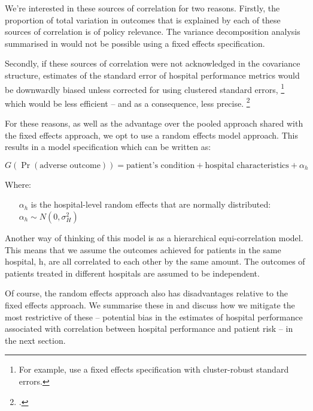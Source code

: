 \documentclass[submission]{grattan}
\begin{document}
We're interested in these sources of correlation for two reasons.
Firstly, the proportion of total variation in outcomes that is explained by each of these sources of correlation is of policy relevance.
The variance decomposition analysis summarised in  would not be possible using a fixed effects specification.

Secondly, if these sources of correlation were not acknowledged in the covariance structure, estimates of the standard error of hospital performance metrics would be downwardly biased unless corrected for using clustered standard errors,%
  \footnote{For example, \textcite{Moran_2014} use a fixed effects specification with cluster-robust standard errors.}
which would be less efficient -- and as a consequence, less precise.%
	\footcite{Cameron-Trivedi-Microeconometrics-methods}

For these reasons, as well as the advantage over the pooled approach shared with the fixed effects approach, we opt to use a random effects model approach.
This results in a model specification which can be written as:

\[G(\Pr(\text{adverse\ outcome})) = \text{patient's condition} + \text{hospital characteristics} + \alpha_{h}\]

Where:

\begin{itemize}
\item[\(\alpha_{h}\)] is the hospital-level random effects that are normally distributed: \(\alpha_{h}\sim N(0,\sigma_{H}^{2})\ \)
\end{itemize}

Another way of thinking of this model is as a hierarchical equi-correlation model.
This means that we assume the outcomes achieved for patients in the same hospital, h, are all correlated to each other by the same amount.
The outcomes of patients treated in different hospitals are assumed to be independent.

Of course, the random effects approach also has disadvantages relative to the fixed effects approach.
We summarise these in  and discuss how we mitigate the most restrictive of these -- potential bias in the estimates of hospital performance associated with correlation between hospital performance and patient risk -- in the next section.
\end{document}
